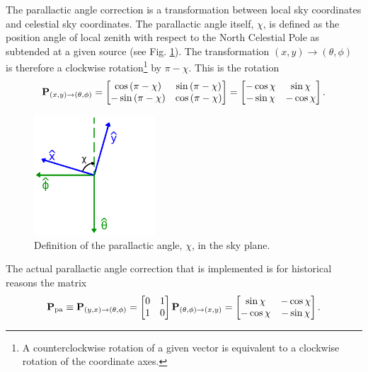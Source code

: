 \documentclass{book}
\newcommand{\transmat}[4]{\ensuremath{{\bf P}_{(#1,#2)\rightarrow(#3,#4)}}}
\newcommand{\pamat}{\ensuremath{{\bf P}_\text{pa}}}
\begin{document}
The parallactic angle correction is a transformation between local sky coordinates and celestial sky coordinates.
The parallactic angle itself, $\chi$, is defined as the position angle of local zenith with respect to the North Celestial Pole as subtended at a given source (see Fig. \ref{fig:skyangles}).
The transformation $(x,y)\rightarrow(\theta,\phi)$ is therefore a clockwise rotation\footnote{A counterclockwise rotation of a given vector is equivalent to a clockwise rotation of the coordinate axes.} by $\pi - \chi$.
This is the rotation
\begin{equation}
    \transmat{x}{y}{\theta}{\phi}
        = \begin{bmatrix}
             \cos\left(\pi - \chi\right) & \sin\left(\pi - \chi\right) \\
            -\sin\left(\pi - \chi\right) & \cos\left(\pi - \chi\right)
        \end{bmatrix}
        = \begin{bmatrix}
            -\cos\chi &  \sin\chi \\
            -\sin\chi & -\cos\chi
        \end{bmatrix}.
\end{equation}
\begin{figure}[!th]
    \centering
    \includegraphics[width=0.4\textwidth]{skyangles.png}
    \caption{Definition of the parallactic angle, $\chi$, in the sky plane.}
    \label{fig:skyangles}
\end{figure}
The actual parallactic angle correction that is implemented is for historical reasons the matrix
\begin{equation}
    \pamat \equiv
    \transmat{y}{x}{\theta}{\phi}
        = \begin{bmatrix} 0 & 1 \\ 1 & 0 \end{bmatrix} \transmat{\theta}{\phi}{x}{y}
        = \begin{bmatrix}
             \sin\chi & -\cos\chi \\
            -\cos\chi & -\sin\chi
        \end{bmatrix}.
\end{equation}
\end{document}
